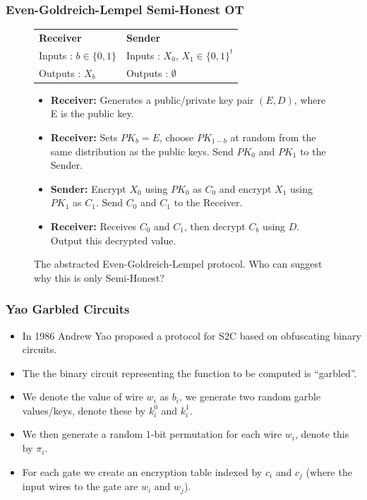 \documentclass{beamer}
\begin{document}
	\begin{frame}
		\frametitle{Even-Goldreich-Lempel Semi-Honest OT}
		\begin{figure}[!htb]
			\begin{tabular}[!htb]{p{6cm} p{6cm}}
				\textbf{Receiver} & \textbf{Sender}\\
				Inputs : $b \in \{0, 1\}$ & Inputs : $X_0$, $X_1 \in \{0,1\}^t$\\
				Outputs : $X_b$ & Outputs : $\emptyset$\\
			\end{tabular}

			\begin{itemize}
				\setlength{\itemsep}{0.5pt}
				\setlength{\parskip}{0pt}
				\setlength{\parsep}{0pt}

 				\item \textbf{Receiver:} Generates a public/private key pair $(E, D)$, where E is the public key.\\
				\item \textbf{Receiver:} Sets $PK_b = E$, choose $PK_{1-b}$ at random from the same distribution as the public keys. Send $PK_0$ and $PK_1$ to the Sender.\\
				\item \textbf{Sender:} Encrypt $X_0$ using $PK_0$ as $C_0$ and encrypt $X_1$ using $PK_1$ as $C_1$. Send $C_0$ and $C_1$ to the Receiver.\\
				\item \textbf{Receiver:} Receives $C_0$ and $C_1$, then decrypt $C_b$ using $D$. Output this decrypted value.
			\end{itemize}

			\caption{The abstracted Even-Goldreich-Lempel protocol. Who can suggest why this is only Semi-Honest? \label{fig:EvenGoldreichLempel}}
		\end{figure}
	\end{frame}

	\begin{frame}
		\frametitle{Yao Garbled Circuits}
		\begin{itemize}
			\item In 1986 Andrew Yao proposed a protocol for S2C based on obfuscating binary circuits.
			\item The the binary circuit representing the function to be computed is ``garbled''.
			\item We denote the value of wire $w_i$ as $b_i$, we generate two random garble values/keys, denote these by $k_i^0$ and $k_i^1$.
			\item We then generate a random 1-bit permutation for each wire $w_i$, denote this by $\pi_i$.
			\item For each gate we create an encryption table indexed by $c_i$ and $c_j$ (where the input wires to the gate are $w_i$ and $w_j$).
		\end{itemize}

	\end{frame}
\end{document}
